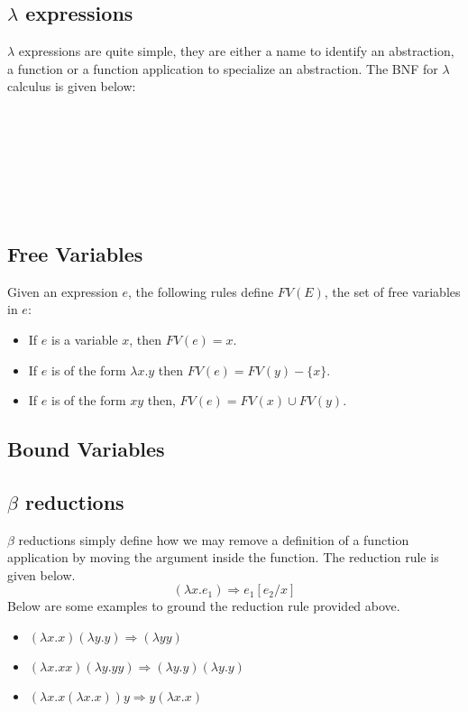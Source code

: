 \documentclass[a4paper,11pt]{article}
\begin{document}
\subsection{$\lambda$ expressions}
$\lambda$ expressions are quite simple, they are either a name to identify an abstraction, a function or a function application to specialize an abstraction. 
The BNF for $\lambda$ calculus is given below:
\begin{bnf*}
   \bnfor {} \bnfor {} \\
   \bnfsk {} \\ 
  \bnfts{$\lambda$}   \\
   \\ 
  \bnfts{(}  \ \  \bnfts{)} \\
   \\
\end{bnf*}

\subsection{Free Variables}
Given an expression $e$, the following rules define $FV(E)$, the set of free variables in $e$:
\begin{itemize}
  \item If $e$ is a variable $x$, then $FV(e) = x$. 
  \item If $e$ is of the form $\lambda x.y$ then $FV(e) = FV(y) - \{x\}$.
  \item If $e$ is of the form $xy$ then, $FV(e) = FV(x) \cup FV(y)$.
\end{itemize}
\subsection{Bound Variables}

\subsection{$\beta$ reductions}
$\beta$ reductions simply define how we may remove a definition of a function application by moving the argument inside the function. The reduction rule is given below. 
$$
(\lambda x . e_1) \Rightarrow e_1[e_2/x]
$$
Below are some examples to ground the reduction rule provided above. 
\begin{itemize}
  \item $(\lambda x . x) (\lambda y . y) \Rightarrow (\lambda y y)$
  \item $(\lambda x . x x) (\lambda y . y y) \Rightarrow (\lambda y . y) (\lambda y . y)$
  \item $(\lambda x . x (\lambda x . x)) y \Rightarrow y (\lambda x . x )$
\end{itemize}
\end{document}
